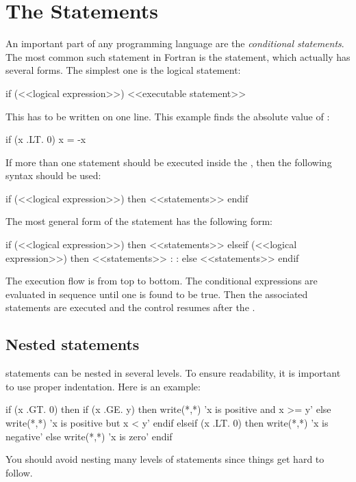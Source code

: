 \section{The \texorpdfstring{}{if} Statements}

An important part of any programming language are the
\textit{conditional statements}. The most common such statement in
Fortran is the  statement, which actually has
several forms. The simplest one is the logical 
statement:

\begin{fortran77}
      if (<<logical expression>>) <<executable statement>>
\end{fortran77}

This has to be written on one line. This example finds the absolute
value of :

\begin{fortran77}
      if (x .LT. 0) x = -x
\end{fortran77}

If more than one statement should be executed inside the
, then the following syntax should be used:

\begin{fortran77}
      if (<<logical expression>>) then
         <<statements>>
      endif
\end{fortran77}

The most general form of the  statement has the
following form:

\begin{fortran77}
      if (<<logical expression>>) then
         <<statements>>
      elseif (<<logical expression>>) then
         <<statements>>
       :
       :
      else
         <<statements>>
      endif
\end{fortran77}

The execution flow is from top to bottom. The conditional expressions
are evaluated in sequence until one is found to be true. Then the
associated statements are executed and the control resumes after the
.


\subsection*{Nested  statements}

 statements can be nested in several levels. To
ensure readability, it is important to use proper indentation. Here is
an example:

\begin{fortran77}
      if (x .GT. 0) then
         if (x .GE. y) then
            write(*,*) 'x is positive and x >= y'
         else
            write(*,*) 'x is positive but x < y'
         endif
      elseif (x .LT. 0) then
         write(*,*) 'x is negative'
      else
         write(*,*) 'x is zero'
      endif
\end{fortran77}

You should avoid nesting many levels of  statements
since things get hard to follow.
